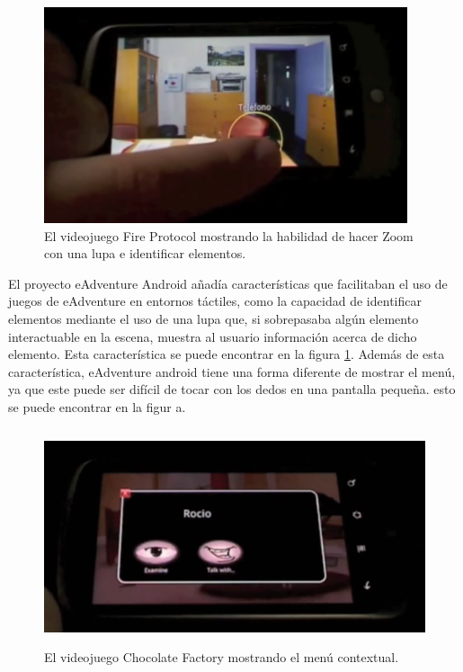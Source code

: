\begin{figure}[htb]
	\centerline{\includegraphics[height=2.5in]{figures/eandroid.png}}
	\caption[eAdventure Android - Lupa]{El videojuego Fire Protocol mostrando la habilidad de hacer Zoom con una lupa e identificar elementos.}
	\label{eandroidlupa}
\end{figure}

El proyecto eAdventure Android añadía características que facilitaban el uso de juegos de eAdventure en entornos táctiles, como la capacidad de identificar elementos mediante el uso de una lupa que, si sobrepasaba algún elemento interactuable en la escena, muestra al usuario información acerca de dicho elemento. Esta característica se puede encontrar en la figura \ref{eandroidlupa}. Además de esta característica, eAdventure android tiene una forma diferente de mostrar el menú, ya que este puede ser difícil de tocar con los dedos en una pantalla pequeña. esto se puede encontrar en la figur a\label{eandroidmenu}.

\begin{figure}[htb]
	\centerline{\includegraphics[height=2.5in]{figures/eandroid-menu.png}}
	\caption[eAdventure Android - Menu]{El videojuego Chocolate Factory mostrando el menú contextual.}
	\label{eandroidmenu}
\end{figure}

